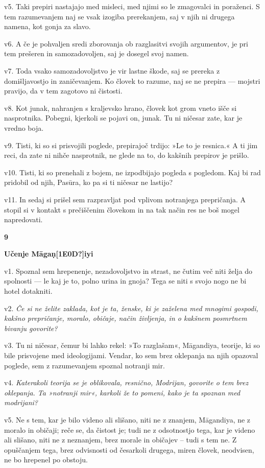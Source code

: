 v5. Taki prepiri nastajajo med misleci, med njimi so le zmagovalci in poraženci. S tem razumevanjem naj se vsak izogiba prerekanjem, saj v njih ni drugega namena, kot gonja za slavo.

v6. A če je pohvaljen sredi zborovanja ob razglasitvi svojih argumentov, je pri tem prešeren in samozadovoljen, saj je dosegel svoj namen.

v7. Toda vsako samozadovoljstvo je vir lastne škode, saj se prereka z domišljavostjo in zaničevanjem. Ko človek to razume, naj se ne prepira --- mojstri pravijo, da v tem zagotovo ni čistosti.

v8. Kot junak, nahranjen s kraljevsko hrano, človek kot grom vneto išče si nasprotnika. Pobegni, kjerkoli se pojavi on, junak. Tu ni ničesar zate, kar je vredno boja.

v9. Tisti, ki so si prisvojili poglede, prepirajoč trdijo: »Le to je resnica.« A ti jim reci, da zate ni nihče nasprotnik, ne glede na to, do kakšnih prepirov je prišlo.

v10. Tisti, ki so prenehali z bojem, ne izpodbijajo pogleda s pogledom. Kaj bi rad pridobil od njih, Pasūra, ko pa si ti ničesar ne lastijo?

v11. In sedaj si prišel sem razpravljat pod vplivom notranjega prepričanja. A stopil si v kontakt s prečiščenim človekom in na tak način res ne boš mogel napredovati.

\textbf{9 }

\textbf{Učenje Māgaṇ{[}1E0D?{]}iyi }

v1. Spoznal sem hrepenenje, nezadovoljstvo in strast, ne čutim več niti želja do spolnosti --- le kaj je to, polno urina in gnoja? Tega se niti s svojo nogo ne bi hotel dotakniti.

v2. \emph{Če si ne želite zaklada, kot je ta, ženske, ki je zaželena med mnogimi gospodi, kakšno prepričanje, moralo, običaje, način življenja, in o kakšnem posmrtnem bivanju govorite?}

v3. Tu ni ničesar, čemur bi lahko rekel: »To razglašam«, Māgandiya, teorije, ki so bile prisvojene med ideologijami. Vendar, ko sem brez oklepanja na njih opazoval poglede, sem z razumevanjem spoznal notranji mir.

v4. \emph{Katerakoli teorija se je oblikovala, resnično, Modrijan, govorite o tem brez oklepanja. Ta »notranji mir«, karkoli že to pomeni, kako je ta spoznan med modrijani?}

v5. Ne s tem, kar je bilo videno ali slišano, niti ne z znanjem, Māgandiya, ne z moralo in običaji; reče se, da čistost je; tudi ne z odsotnostjo tega, kar je videno ali slišano, niti ne z neznanjem, brez morale in običajev -- tudi s tem ne. Z opuščanjem tega, brez odvisnosti od česarkoli drugega, miren človek, neodvisen, ne bo hrepenel po obstoju.

